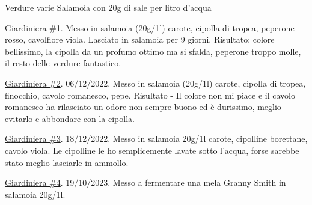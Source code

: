 \cooktime[]{-}%
\begin{ingreds}
	Verdure varie
	Salamoia con 20g di sale per litro d'acqua



\end{ingreds}

\begin{method}
\underline{Giardiniera \#1}. Messo in salamoia (20g/1l) carote, cipolla di tropea, peperone rosso, cavolfiore viola. Lasciato in salamoia per 9 giorni. Risultato: colore bellissimo, la cipolla da un profumo ottimo ma si sfalda, peperone troppo molle, il resto delle verdure fantastico.

\underline{Giardiniera \#2}. 06/12/2022. Messo in salamoia (20g/1l) carote, cipolla di tropea, finocchio, cavolo romanesco, pepe. Risultato - Il colore non mi piace e il cavolo romanesco ha rilasciato un odore non sempre buono ed è durissimo, meglio evitarlo e abbondare con la cipolla.

\underline{Giardiniera \#3}. 18/12/2022. Messo in salamoia 20g/1l carote, cipolline borettane, cavolo viola. Le cipolline le ho semplicemente lavate sotto l'acqua, forse sarebbe stato meglio lasciarle in ammollo.

\underline{Giardiniera \#4}. 19/10/2023. Messo a fermentare una mela Granny Smith in salamoia 20g/1l.



\end{method}




